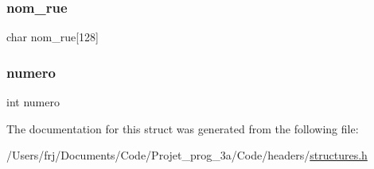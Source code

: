 \subsubsection{\texorpdfstring{nom\+\_\+rue}{nom\_rue}}
{\footnotesize\ttfamily char nom\+\_\+rue\mbox{[}128\mbox{]}}

\hypertarget{structadresse_a2c30f43104974e72e2809fb4569804b0}{}\label{structadresse_a2c30f43104974e72e2809fb4569804b0} 
\subsubsection{\texorpdfstring{numero}{numero}}
{\footnotesize\ttfamily int numero}



The documentation for this struct was generated from the following file\+:\begin{DoxyCompactItemize}
\item 
/\+Users/frj/\+Documents/\+Code/\+Projet\+\_\+prog\+\_\+3a/\+Code/headers/\hyperlink{structures_8h}{structures.\+h}\end{DoxyCompactItemize}
